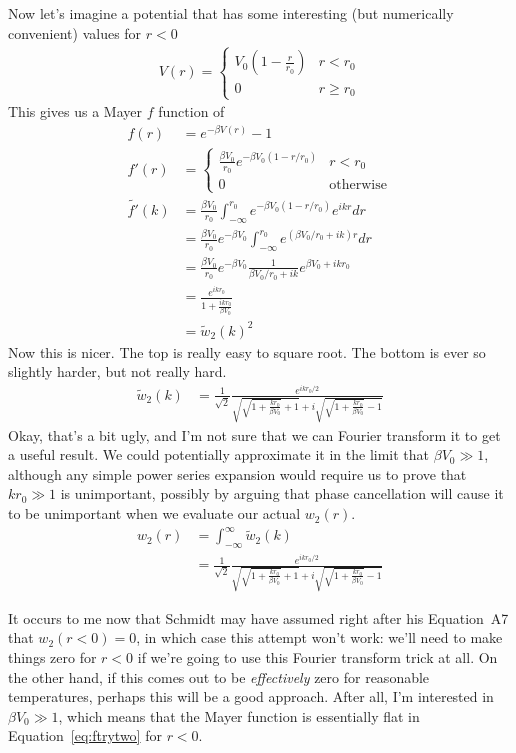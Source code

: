 \documentclass[letterpaper,twocolumn,amsmath,amssymb,prb]{revtex4-1}
\begin{document}
Now let's imagine a potential that has some interesting (but
numerically convenient) values for $r<0$
\begin{align}
  V(r) =
  \begin{cases}
    V_0\left(1 - \frac{r}{r_0}\right) & r < r_0 \\
    0 & r \ge r_0
  \end{cases}
\end{align}
This gives us a Mayer $f$ function of
\begin{align}
  f(r) &= e^{-\beta V(r)} - 1 \label{eq:ftrytwo} \\
  f'(r) &=
  \begin{cases}
    \frac{\beta V_0}{r_0} e^{-\beta V_0(1-r/r_0)} & r < r_0 \\
    0 & \text{otherwise}
  \end{cases} \\
  \tilde{f'}(k) &= \frac{\beta V_0}{r_0}\int_{-\infty}^{r_0} e^{-\beta
    V_0(1-r/r_0)}e^{ikr}dr \\
  &= \frac{\beta V_0}{r_0}e^{-\beta V_0}
  \int_{-\infty}^{r_0} e^{(\beta V_0/r_0 + ik)r} dr
  \\
  &= \frac{\beta V_0}{r_0}e^{-\beta V_0} \frac{1}{\beta V_0/r_0 + ik}e^{\beta V_0+ikr_0}
  \\
  &= \frac{e^{ikr_0}}{1 + \frac{ikr_0}{\beta V_0}}
  \\
  &= \tilde{w}_2(k)^2
\end{align}
Now this is nicer.  The top is really easy to square root.  The bottom
is ever so slightly harder, but not really hard.
\begin{align}
  \tilde{w}_2(k) &=
  \frac1{\sqrt{2}}\frac{e^{ikr_0/2}}{\sqrt{\sqrt{1+\frac{kr_0}{\beta
          V_0}}+1} +
      i\sqrt{\sqrt{1+\frac{kr_0}{\beta V_0}}-1}}
\end{align}
Okay, that's a bit ugly, and I'm not sure that we can Fourier
transform it to get a useful result.  We could potentially approximate
it in the limit that $\beta V_0 \gg 1$, although any simple power
series expansion would require us to prove that $kr_0\gg1$ is
unimportant, possibly by arguing that phase cancellation will cause it
to be unimportant when we evaluate our actual $w_2(r)$.
\begin{align}
  w_2(r) &= \int_{-\infty}^\infty \tilde{w}_2(k) \\
 &=
  \frac1{\sqrt{2}}\frac{e^{ikr_0/2}}{\sqrt{\sqrt{1+\frac{kr_0}{\beta
          V_0}}+1} +
      i\sqrt{\sqrt{1+\frac{kr_0}{\beta V_0}}-1}}
\end{align}

It occurs to me now that Schmidt may have assumed right after his
Equation~A7 that $w_2(r<0)=0$, in which case this attempt won't work:
we'll need to make things zero for $r<0$ if we're going to use this
Fourier transform trick at all.  On the other hand, if this comes out
to be \emph{effectively} zero for reasonable temperatures, perhaps
this will be a good approach.  After all, I'm interested in $\beta V_0
\gg 1$, which means that the Mayer function is essentially flat in
Equation~\ref{eq:ftrytwo} for $r<0$.

\end{document}
